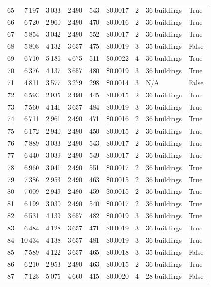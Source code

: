 \documentclass[a4paper,11pt]{article}
\begin{document}
\begin{table}[ht]
\begin{tabular}{r r r r r r r p{3cm} l}
65 & 7\,197 & 3\,033 & 2\,490 & 543 & \$0.0017 & 2 & 36 buildings & True \\
66 & 6\,720 & 2\,960 & 2\,490 & 470 & \$0.0016 & 2 & 36 buildings & True \\
67 & 5\,854 & 3\,042 & 2\,490 & 552 & \$0.0017 & 2 & 36 buildings & True \\
68 & 5\,808 & 4\,132 & 3\,657 & 475 & \$0.0019 & 3 & 35 buildings & False \\
69 & 6\,710 & 5\,186 & 4\,675 & 511 & \$0.0022 & 4 & 36 buildings & True \\
70 & 6\,376 & 4\,137 & 3\,657 & 480 & \$0.0019 & 3 & 36 buildings & True \\
71 & 4\,811 & 3\,577 & 3\,279 & 298 & \$0.0014 & 3 & N/A & False \\
72 & 6\,593 & 2\,935 & 2\,490 & 445 & \$0.0015 & 2 & 36 buildings & True \\
73 & 7\,560 & 4\,141 & 3\,657 & 484 & \$0.0019 & 3 & 36 buildings & True \\
74 & 6\,711 & 2\,961 & 2\,490 & 471 & \$0.0016 & 2 & 36 buildings & True \\
75 & 6\,172 & 2\,940 & 2\,490 & 450 & \$0.0015 & 2 & 36 buildings & True \\
76 & 7\,889 & 3\,033 & 2\,490 & 543 & \$0.0017 & 2 & 36 buildings & True \\
77 & 6\,440 & 3\,039 & 2\,490 & 549 & \$0.0017 & 2 & 36 buildings & True \\
78 & 6\,960 & 3\,041 & 2\,490 & 551 & \$0.0017 & 2 & 36 buildings & True \\
79 & 7\,386 & 2\,953 & 2\,490 & 463 & \$0.0015 & 2 & 36 buildings & True \\
80 & 7\,009 & 2\,949 & 2\,490 & 459 & \$0.0015 & 2 & 36 buildings & True \\
81 & 6\,199 & 3\,030 & 2\,490 & 540 & \$0.0017 & 2 & 36 buildings & True \\
82 & 6\,531 & 4\,139 & 3\,657 & 482 & \$0.0019 & 3 & 36 buildings & True \\
83 & 6\,484 & 4\,128 & 3\,657 & 471 & \$0.0019 & 3 & 36 buildings & True \\
84 & 10\,434 & 4\,138 & 3\,657 & 481 & \$0.0019 & 3 & 36 buildings & True \\
85 & 7\,589 & 4\,122 & 3\,657 & 465 & \$0.0018 & 3 & 35 buildings & False \\
86 & 6\,210 & 2\,953 & 2\,490 & 463 & \$0.0015 & 2 & 36 buildings & True \\
87 & 7\,128 & 5\,075 & 4\,660 & 415 & \$0.0020 & 4 & 28 buildings & False \\

\end{tabular}
\end{table}
\end{document}
